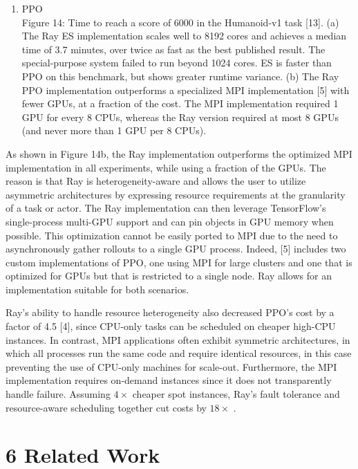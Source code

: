 \documentclass[
]{article}
\providecommand{\tightlist}{%
  \setlength{\itemsep}{0pt}\setlength{\parskip}{0pt}}
\begin{document}
\begin{enumerate}
\def\labelenumi{(\alph{enumi})}
\setcounter{enumi}{1}
\tightlist
\item
  PPO\\
  Figure 14: Time to reach a score of 6000 in the Humanoid-v1 task
  {[}13{]}. (a) The Ray ES implementation scales well to 8192 cores and
  achieves a median time of 3.7 minutes, over twice as fast as the best
  published result. The special-purpose system failed to run beyond 1024
  cores. ES is faster than PPO on this benchmark, but shows greater
  runtime variance. (b) The Ray PPO implementation outperforms a
  specialized MPI implementation {[}5{]} with fewer GPUs, at a fraction
  of the cost. The MPI implementation required 1 GPU for every 8 CPUs,
  whereas the Ray version required at most 8 GPUs (and never more than 1
  GPU per 8 CPUs).
\end{enumerate}

As shown in Figure 14b, the Ray implementation outperforms the optimized
MPI implementation in all experiments, while using a fraction of the
GPUs. The reason is that Ray is heterogeneity-aware and allows the user
to utilize asymmetric architectures by expressing resource requirements
at the granularity of a task or actor. The Ray implementation can then
leverage TensorFlow's single-process multi-GPU support and can pin
objects in GPU memory when possible. This optimization cannot be easily
ported to MPI due to the need to asynchronously gather rollouts to a
single GPU process. Indeed, {[}5{]} includes two custom implementations
of PPO, one using MPI for large clusters and one that is optimized for
GPUs but that is restricted to a single node. Ray allows for an
implementation suitable for both scenarios.

Ray's ability to handle resource heterogeneity also decreased PPO's cost
by a factor of 4.5 {[}4{]}, since CPU-only tasks can be scheduled on
cheaper high-CPU instances. In contrast, MPI applications often exhibit
symmetric architectures, in which all processes run the same code and
require identical resources, in this case preventing the use of CPU-only
machines for scale-out. Furthermore, the MPI implementation requires
on-demand instances since it does not transparently handle failure.
Assuming \(4 \times\) cheaper spot instances, Ray's fault tolerance and
resource-aware scheduling together cut costs by \(18 \times\) .

\section{6 Related Work}\label{related-work}
\end{document}
